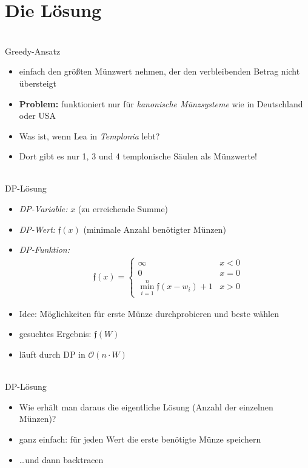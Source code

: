 \documentclass[hyphens,compress,fleqn]{beamer}
\begin{document}
	\section{Die Lösung}
	\begin{frame}{{\footnotesize\insertsectionhead\\}Greedy-Ansatz}
	\begin{itemize}[<+->]
		\item einfach den größten Münzwert nehmen, der den verbleibenden Betrag nicht übersteigt
		\item \textbf{Problem:} funktioniert nur für \textit{kanonische Münzsysteme} wie in Deutschland oder USA
		\item Was ist, wenn Lea in \textit{Templonia} lebt?
		\item Dort gibt es nur 1, 3 und 4 templonische Säulen als Münzwerte!
	\end{itemize}
	\end{frame}

	\begin{frame}{{\footnotesize\insertsectionhead\\}DP-Lösung}
	\begin{itemize}[<+->]
		\item \textit{DP-Variable:} $x$ (zu erreichende Summe)
		\item \textit{DP-Wert:} $\mathfrak{f}(x)$ (minimale Anzahl benötigter Münzen)
		\item \textit{DP-Funktion:}\begin{align*}
		& \mathfrak{f}(x) =
		\begin{cases}
		\infty & x < 0 \\
		0 & x = 0 \\
		\min_{i = 1}^{n} \mathfrak{f}(x-w_i) + 1 & x > 0
		\end{cases}
		\end{align*}
		\item Idee: Möglichkeiten für erste Münze durchprobieren und beste wählen
		\item gesuchtes Ergebnis: $\mathfrak{f}(W)$
		\item läuft durch DP in $\mathcal{O}(n\cdot W)$
	\end{itemize}
	\end{frame}

	\begin{frame}{{\footnotesize\insertsectionhead\\}DP-Lösung}
	\begin{itemize}[<+->]
		\item Wie erhält man daraus die eigentliche Lösung (Anzahl der einzelnen Münzen)?
		\item ganz einfach: für jeden Wert die erste benötigte Münze speichern
		\item \dots und dann backtracen
	\end{itemize}
	\end{frame}
\end{document}
